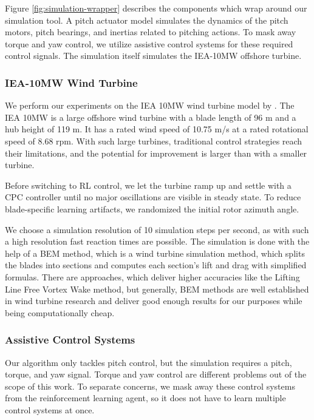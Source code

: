 Figure \ref{fig:simulation-wrapper} describes the components which wrap around our simulation tool. A pitch actuator model simulates the dynamics of the pitch motors, pitch bearings, and inertias related to pitching actions. To mask away torque and yaw control, we utilize assistive control systems for these required control signals. The simulation itself simulates the IEA-10MW offshore turbine.

\subsubsection{IEA-10MW Wind Turbine}

We perform our experiments on the IEA 10MW wind turbine model by \citet{bortolottiIEAWindTCP2019}. The IEA 10MW is a large offshore wind turbine with a blade length of 96 m and a hub height of 119 m. It has a rated wind speed of 10.75 m/s at a rated rotational speed of 8.68 rpm. With such large turbines, traditional control strategies reach their limitations, and the potential for improvement is larger than with a smaller turbine.

Before switching to RL control, we let the turbine ramp up and settle with a \ac{CPC} controller until no major oscillations are visible in steady state. To reduce blade-specific learning artifacts, we randomized the initial rotor azimuth angle. 

We choose a simulation resolution of 10 simulation steps per second, as with such a high resolution fast reaction times are possible. The simulation is done with the help of a \acf{BEM} method, which is a wind turbine simulation method, which splits the blades into sections and computes each section's lift and drag with simplified formulas. There are approaches, which deliver higher accuracies like the Lifting Line Free Vortex Wake method, but generally, \ac{BEM} methods are well established in wind turbine research and deliver good enough results for our purposes while being computationally cheap.

\subsubsection{Assistive Control Systems}

Our algorithm only tackles pitch control, but the simulation requires a pitch, torque, and yaw signal. Torque and yaw control are different problems out of the scope of this work. To separate concerns, we mask away these control systems from the reinforcement learning agent, so it does not have to learn multiple control systems at once. 

